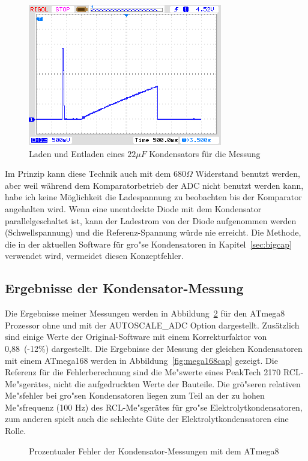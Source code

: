 \begin{figure}[H]
  \centering
    \includegraphics[]{../PNG/charge_22uF.png}
  \caption{Laden und Entladen eines \(22\mu F\) Kondensators f\"ur die Messung}
  \label{pic:c22uF}
\end{figure}


Im Prinzip kann diese Technik auch mit dem \(680\Omega\) Widerstand benutzt werden,
aber weil w\"ahrend dem Komparatorbetrieb der ADC nicht benutzt werden kann, habe ich keine
M\"oglichkeit die Ladespannung zu beobachten bis der Komparator angehalten wird.
Wenn eine unentdeckte Diode mit dem Kondensator parallelgeschaltet ist, kann der Ladestrom
von der Diode aufgenommen werden (Schwellspannung) und die Referenz-Spannung w\"urde nie erreicht.
Die Methode, die in der aktuellen Software f\"ur gro"se Kondensatoren in Kapitel~\ref{sec:bigcap}
verwendet wird, vermeidet diesen Konzeptfehler.

\subsection{Ergebnisse der Kondensator-Messung}
Die Ergebnisse meiner Messungen werden in Abbildung~\ref{fig:mega8cap} f\"ur den ATmega8 Prozessor ohne und mit
der AUTOSCALE\_ADC Option dargestellt. Zus\"atzlich sind einige Werte der Original-Software mit einem Korrekturfaktor
von 0,88~(-12\%) dargestellt.
Die Ergebnisse der Messung der gleichen Kondensatoren mit einem ATmega168 werden in Abbildung~\ref{fig:mega168cap} gezeigt.
Die Referenz f\"ur die Fehlerberechnung sind die Me"swerte eines PeakTech 2170 RCL-Me"sger\"ates, 
 nicht die aufgedruckten Werte der Bauteile.
Die gr\"o"seren relativen Me"sfehler bei gro"sen Kondensatoren liegen zum Teil an der zu hohen Me"sfrequenz (100 Hz) des
RCL-Me"sger\"ates f\"ur gro"se Elektrolytkondensatoren, zum anderen spielt auch die schlechte G\"ute der
Elektrolytkondensatoren eine Rolle.

\begin{figure}[H]
\centering

\caption{Prozentualer Fehler der Kondensator-Messungen mit dem ATmega8}
\label{fig:mega8cap}
\end{figure}

